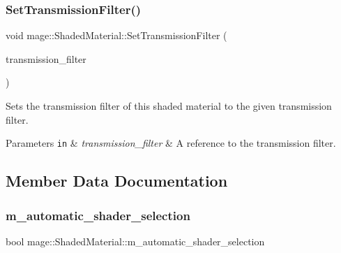 \subsubsection{\texorpdfstring{Set\+Transmission\+Filter()}{SetTransmissionFilter()}\hspace{0.1cm}{\footnotesize\ttfamily [2/2]}}
{\footnotesize\ttfamily void mage\+::\+Shaded\+Material\+::\+Set\+Transmission\+Filter (\begin{DoxyParamCaption}\item[{\hyperlink{structmage_1_1_r_g_b_spectrum}{R\+G\+B\+Spectrum} \&\&}]{transmission\+\_\+filter }\end{DoxyParamCaption})}

Sets the transmission filter of this shaded material to the given transmission filter.


\begin{DoxyParams}[1]{Parameters}
\mbox{\tt in}  & {\em transmission\+\_\+filter} & A reference to the transmission filter. \\
\hline
\end{DoxyParams}


\subsection{Member Data Documentation}
\hypertarget{structmage_1_1_shaded_material_a744f6e4c0318f29f343039d6be072b66}{}\label{structmage_1_1_shaded_material_a744f6e4c0318f29f343039d6be072b66} 
\subsubsection{\texorpdfstring{m\+\_\+automatic\+\_\+shader\+\_\+selection}{m\_automatic\_shader\_selection}}
{\footnotesize\ttfamily bool mage\+::\+Shaded\+Material\+::m\+\_\+automatic\+\_\+shader\+\_\+selection\hspace{0.3cm}{\ttfamily [private]}}

\hypertarget{structmage_1_1_shaded_material_a59a4b0ecb6ab1d60a285e0f1f69b5e36}{}\label{structmage_1_1_shaded_material_a59a4b0ecb6ab1d60a285e0f1f69b5e36} 
